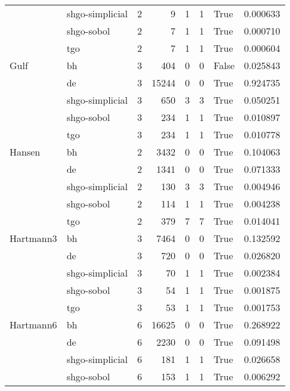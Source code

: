 \begin{longtable}{llrrrrlr}
         & shgo-simplicial &     2 &        9 &      1 &       1 &    True &    0.000633 \\
         & shgo-sobol &     2 &        7 &      1 &       1 &    True &    0.000710 \\
         & tgo &     2 &        7 &      1 &       1 &    True &    0.000604 \\
Gulf & bh &     3 &      404 &      0 &       0 &   False &    0.025843 \\
         & de &     3 &    15244 &      0 &       0 &    True &    0.924735 \\
         & shgo-simplicial &     3 &      650 &      3 &       3 &    True &    0.050251 \\
         & shgo-sobol &     3 &      234 &      1 &       1 &    True &    0.010897 \\
         & tgo &     3 &      234 &      1 &       1 &    True &    0.010778 \\
Hansen & bh &     2 &     3432 &      0 &       0 &    True &    0.104063 \\
         & de &     2 &     1341 &      0 &       0 &    True &    0.071333 \\
         & shgo-simplicial &     2 &      130 &      3 &       3 &    True &    0.004946 \\
         & shgo-sobol &     2 &      114 &      1 &       1 &    True &    0.004238 \\
         & tgo &     2 &      379 &      7 &       7 &    True &    0.014041 \\
Hartmann3 & bh &     3 &     7464 &      0 &       0 &    True &    0.132592 \\
         & de &     3 &      720 &      0 &       0 &    True &    0.026820 \\
         & shgo-simplicial &     3 &       70 &      1 &       1 &    True &    0.002384 \\
         & shgo-sobol &     3 &       54 &      1 &       1 &    True &    0.001875 \\
         & tgo &     3 &       53 &      1 &       1 &    True &    0.001753 \\
Hartmann6 & bh &     6 &    16625 &      0 &       0 &    True &    0.268922 \\
         & de &     6 &     2230 &      0 &       0 &    True &    0.091498 \\
         & shgo-simplicial &     6 &      181 &      1 &       1 &    True &    0.026658 \\
         & shgo-sobol &     6 &      153 &      1 &       1 &    True &    0.006292 \\

\end{longtable}
